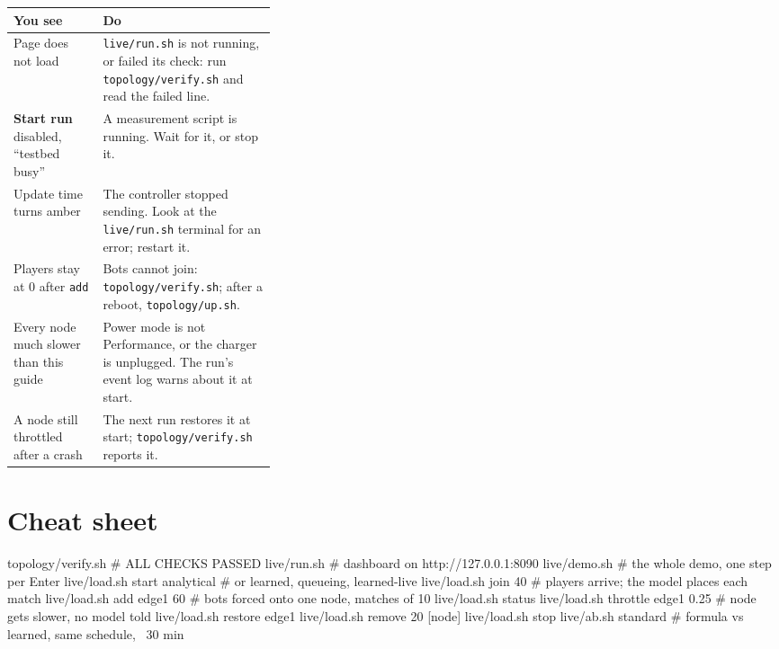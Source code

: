 \documentclass[11pt,a4paper]{article}
\newcommand{\ui}[1]{\textbf{#1}}
\newcommand{\cmd}[1]{\texttt{#1}}
\begin{document}
\begin{tabularx}{\linewidth}{@{}>{\raggedright\arraybackslash}p{0.34\linewidth}X@{}}
\toprule
\textbf{You see} & \textbf{Do} \\
\midrule
Page does not load & \cmd{live/run.sh} is not running, or failed its check: run \cmd{topology/verify.sh} and read the failed line. \\
\ui{Start run} disabled, ``testbed busy'' & A measurement script is running. Wait for it, or stop it. \\
Update time turns amber & The controller stopped sending. Look at the \cmd{live/run.sh} terminal for an error; restart it. \\
Players stay at 0 after \cmd{add} & Bots cannot join: \cmd{topology/verify.sh}; after a reboot, \cmd{topology/up.sh}. \\
Every node much slower than this guide & Power mode is not Performance, or the charger is unplugged. The run's event log warns about it at start. \\
A node still throttled after a crash & The next run restores it at start; \cmd{topology/verify.sh} reports it. \\
\bottomrule
\end{tabularx}

\section*{Cheat sheet}

\begin{term}
topology/verify.sh                 # ALL CHECKS PASSED
live/run.sh                        # dashboard on http://127.0.0.1:8090
live/demo.sh                       # the whole demo, one step per Enter
live/load.sh start analytical      # or learned, queueing, learned-live
live/load.sh join 40               # players arrive; the model places each match
live/load.sh add edge1 60          # bots forced onto one node, matches of 10
live/load.sh status
live/load.sh throttle edge1 0.25   # node gets slower, no model told
live/load.sh restore edge1
live/load.sh remove 20 [node]
live/load.sh stop
live/ab.sh standard                # formula vs learned, same schedule, ~30 min
\end{term}
\end{document}
